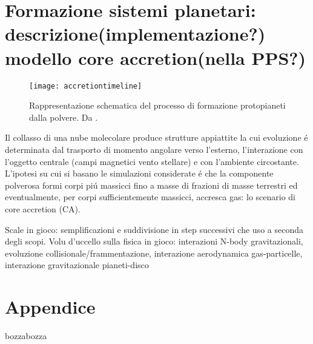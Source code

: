 \documentclass[twoside,11pt,fleqn]{memoir}%
\def\versione{bozza}%
\def\bozza{bozza}
\begin{document}
{\let\clearpage\relax\let\cleardoublepage\relax
\part{Formazione sistemi planetari: descrizione(implementazione?) modello core accretion(nella PPS?)}\label{part:CAdesc}
}
\begin{figure}[!ht]
\texttt{[image: accretiontimeline]}\caption{Rappresentazione schematica del processo di formazione protopianeti dalla polvere. Da \cite{perryman2011exoplanet}.}\label{fig:accretiontimeline}
\end{figure}
\begin{errata}
Il collasso di una nube molecolare produce strutture appiattite la cui evoluzione \'e determinata dal trasporto di momento angolare verso l'esterno, l'interazione con l'oggetto centrale (campi magnetici vento stellare) e con l'ambiente circostante.
L'ipotesi su cui si basano le simulazioni considerate \'e che la componente polverosa formi corpi pi\'u massicci fino a masse di frazioni di masse terrestri  ed eventualmente, per corpi sufficientemente massicci, accresca gas: lo scenario di core accretion (CA).
\end{errata}

\begin{workout}
Scale in gioco: semplificazioni e suddivisione in step successivi che uso a seconda degli scopi.
Volu d'uccello sulla fisica in gioco: interazioni N-body gravitazionali, evoluzione collisionale/frammentazione, interazione aerodynamica gas-particelle, interazione gravitazionale pianeti-disco
\end{workout}



\cleartorecto




{\let\clearpage\relax\let\cleardoublepage\relax
\backmatter
}

\appendix
\part{Appendice}

\printbibliography
\ifx\versione\bozza
\erratac
\fi
\end{document}
